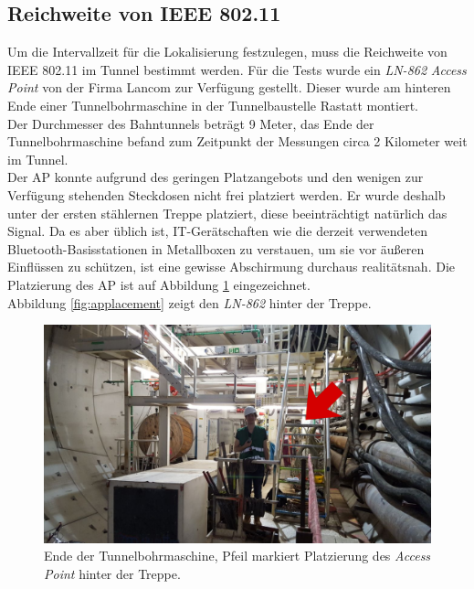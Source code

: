 \subsection{Reichweite von IEEE 802.11}
\label{ch:phase1:sec:rangewlan}
Um die Intervallzeit für die Lokalisierung festzulegen, muss die Reichweite von IEEE 802.11 im Tunnel bestimmt werden.
Für die Tests wurde ein \emph{LN-862} \emph{Access Point} von der Firma Lancom zur Verfügung gestellt.
Dieser wurde am hinteren Ende einer Tunnelbohrmaschine in der Tunnelbaustelle Rastatt montiert.\\
Der Durchmesser des Bahntunnels beträgt 9 Meter, das Ende der Tunnelbohrmaschine befand zum Zeitpunkt der Messungen circa 2 Kilometer weit im Tunnel.\\
Der AP konnte aufgrund des geringen Platzangebots und den wenigen zur Verfügung stehenden Steckdosen nicht frei platziert werden.
Er wurde deshalb unter der ersten stählernen Treppe platziert, diese beeinträchtigt natürlich das Signal.
Da es aber üblich ist, IT-Gerätschaften wie die derzeit verwendeten Bluetooth-Basisstationen in Metallboxen zu verstauen, um sie vor äußeren Einflüssen zu schützen, ist eine gewisse Abschirmung durchaus realitätsnah.
Die Platzierung des AP ist auf Abbildung \ref{fig:tunnelmark} eingezeichnet.\\
Abbildung \ref{fig:applacement} zeigt den \emph{LN-862} hinter der Treppe.

\begin{figure}[h]
  \centering
	\includegraphics[width=\textwidth]{images/tunnelmark.png}
  \caption{Ende der Tunnelbohrmaschine, Pfeil markiert Platzierung des \emph{Access Point} hinter der Treppe.}
  \label{fig:tunnelmark}
\end{figure}

